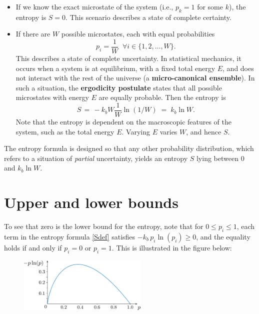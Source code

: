 \documentclass[pra,12pt]{revtex4}
\begin{document}
\begin{itemize}
\item If we know the exact microstate of the system (i.e., $p_k = 1$
  for some $k$), the entropy is $S = 0$.  This scenario
  describes a state of complete certainty.


\item If there are $W$ possible microstates, each with equal
  probabilities
  \begin{equation}
    p_i = \frac{1}{W} \;\;\forall i \in \{1,2,\dots,W\}.
  \end{equation}
  This describes a state of complete uncertainty.  In statistical
  mechanics, it occurs when a system is at equilibrium, with a fixed
  total energy $E$, and does not interact with the rest of the
  universe (a \textbf{micro-canonical ensemble}).  In such a
  situation, the \textbf{ergodicity postulate} states that all
  possible microstates with energy $E$ are equally probable.
  Then the entropy is
  \begin{equation}
    S \,=\, -k_b W \frac{1}{W} \ln(1/W) \;=\; k_b \ln W.
  \end{equation}
  Note that the entropy is dependent on the macroscopic features of
  the system, such as the total energy $E$.  Varying $E$ varies $W$,
  and hence $S$.
\end{itemize}

The entropy formula is designed so that any other probability
distribution, which refers to a situation of \textit{partial}
uncertainty, yields an entropy $S$ lying between $0$
and $k_b \ln W$.

\section{Upper and lower bounds}

To see that zero is the lower bound for the entropy, note that for $0
\le p_i \le 1$, each term in the entropy formula \eqref{Sdef}
satisfies $-k_b\, p_i\ln(p_i) \ge 0$, and the equality holds if and
only if $p_i = 0$ or $p_i = 1$.  This is illustrated in the figure
below:

\begin{figure}[h]
  \includegraphics[width=0.55\textwidth]{plogp}
\end{figure}
\end{document}
